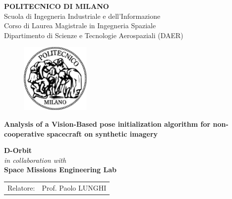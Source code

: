 \begin{titlepage}

\begin{center}
\Large\textbf{{\textsc{POLITECNICO DI MILANO}}}\\
\Large{Scuola di Ingegneria Industriale e dell'Informazione}\\
\large{Corso di Laurea Magistrale in Ingegneria Spaziale}\\
\large{Dipartimento di Scienze e Tecnologie Aerospaziali (DAER)}
\par\end{center}

\vspace{0.5cm}

\begin{center}
\begin{figure}[h]
\centering{}\includegraphics[width=0.3\textwidth]{title-page/logo-polimi}
\end{figure}
\vspace{0.5cm}
\par\end{center}

\begin{center}
\textbf{\LARGE{Analysis of a Vision-Based pose initialization algorithm for non-cooperative spacecraft on synthetic imagery}}\vspace{0.5cm}
\vspace{0.2cm}
\par\end{center}

\begin{center}
\textbf{D-Orbit}\\
\textit{in collaboration with}\\
\textbf{Space Missions Engineering Lab}
\end{center}\vspace{1.5cm}

\begin{flushleft}
\begin{tabular}{ll}
Relatore:  & Prof. Paolo LUNGHI\tabularnewline
\end{tabular}\vspace{1.8cm}
\par\end{flushleft}


\end{titlepage}
